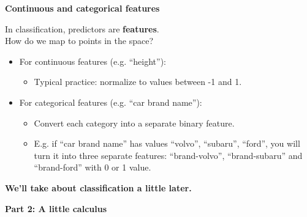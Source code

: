 \documentclass{beamer}
\newcommand{\placard}[1]{
  \begin{frame}
    \begin{center}
      \huge
      \textbf{#1}
    \end{center}
  \end{frame}
}
\newcommand{\pagestepalt}[2]{
  \begin{frame}[t]
    \begin{minipage}[t][0.26\textheight][t]{\textwidth}
      \begin{center}
        \huge
        \textbf{#1}
      \end{center}
    \end{minipage}
    
    \begin{minipage}[t][0.7\textheight][c]{\textwidth}
      #2
    \end{minipage}
  \end{frame}
}
\begin{document}
\pagestepalt{Continuous and categorical features}{
  In classification, predictors are \textbf{features}.\\
  How do we map to points in the space?\pause
  \begin{itemize}
  \item For continuous features (e.g. ``height''):
    \begin{itemize}
    \item Typical practice: normalize to values between -1 and 1. 
    \end{itemize}\pause
  \item For categorical features (e.g. ``car brand name''):
    \begin{itemize}
    \item Convert each category into a separate binary feature.
    \item E.g. if ``car brand name'' has values ``volvo'', ``subaru'',
      ``ford'', you will turn it into three separate features: ``brand-volvo'',
      ``brand-subaru'' and ``brand-ford'' with 0 or 1 value.
    \end{itemize}
  \end{itemize}
}

\placard{We'll take about classification a little later.}

\placard{Part 2: A little calculus}
\end{document}
